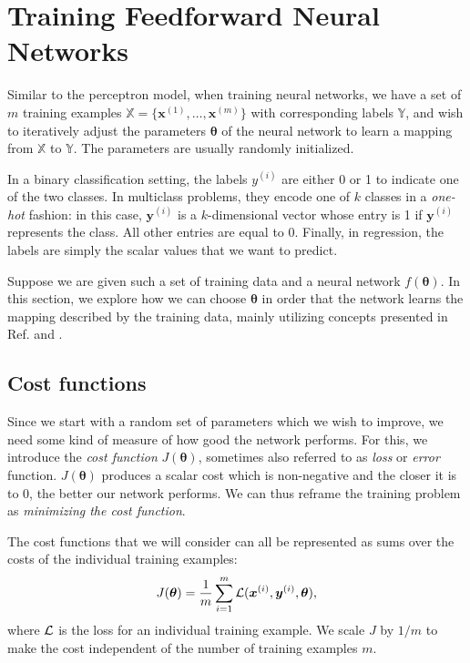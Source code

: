 \section{Training Feedforward Neural Networks}
\label{sec:training}
Similar to the perceptron model, when training neural networks, we have a set of $m$ training examples $\mathbb{X} = \{\bm{x}^{(1)}, \ldots, \bm{x}^{(m)}\}$ with corresponding labels $\mathbb{Y}$, and wish to iteratively adjust the parameters $\bm{\theta}$ of the neural network to learn a mapping from $\mathbb{X}$ to $\mathbb{Y}$. The parameters are usually randomly initialized.

In a binary classification setting, the labels $y^{(i)}$ are either 0 or 1 to indicate one of the two classes. In multiclass problems, they encode one of $k$ classes in a \emph{one-hot} fashion: in this case, $\bm{y}^{(i)}$ is a $k$-dimensional vector whose  entry is 1 if $\bm{y}^{(i)}$ represents the  class. All other entries are equal to 0. Finally, in regression, the labels are simply the scalar values that we want to predict.

Suppose we are given such a set of training data and a neural network $f(\bm{\theta})$. In this section, we explore how we can choose $\bm{\theta}$ in order that the network learns the mapping described by the training data, mainly utilizing concepts presented in Ref. \cite{DBLP:books/daglib/0040158} and \cite{Nielsen2015}.

\subsection{Cost functions}
Since we start with a random set of parameters which we wish to improve, we need some kind of measure of how good the network performs. For this, we introduce the \emph{cost function} $J(\bm{\theta})$, sometimes also referred to as \emph{loss} or \emph{error} function. $J(\bm{\theta})$ produces a scalar cost which is non-negative and the closer it is to 0, the better our network performs. We can thus reframe the training problem as \emph{minimizing the cost function}.

The cost functions that we will consider can all be represented as sums over the costs of the individual training examples:
\begin{equation}
J(\bm{\theta}) = \frac1{m}\sum_{i=1}^{m}\operatorname{\mathcal{L}}(\bm{x}^{(i)},\bm{y}^{(i)},\bm{\theta}),
\end{equation}
where $\operatorname{\mathcal{L}}$ is the loss for an individual training example. We scale $J$ by $1/m$ to make the cost independent of the number of training examples $m$.

